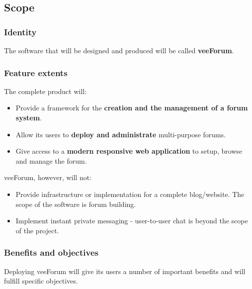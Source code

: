 \documentclass[12pt]{report}
\renewcommand\emph{\textbf}
\begin{document}
                \subsection{Scope}

                    \subsubsection{Identity}
                        The software that will be designed and produced will be called \emph{veeForum}.



                    \subsubsection{Feature extents}

                        The complete product will:

                        \begin{itemize}
                            \item Provide a framework for the \emph{creation and the management of a forum system}.
                            \item Allow its users to \emph{deploy and administrate} multi-purpose forums.
                            \item Give access to a \emph{modern responsive web application} to setup, browse and manage the forum.
                        \end{itemize}

                        veeForum, however, will not:

                        \begin{itemize}
                            \item Provide infrastructure or implementation for a complete blog/website. The scope of the software is forum building.
                            \item Implement instant private messaging - user-to-user chat is beyond the scope of the project.
                        \end{itemize}



                    \subsubsection{Benefits and objectives}

                        Deploying veeForum will give its users a number of important benefits and will fulfill specific objectives.
\end{document}
